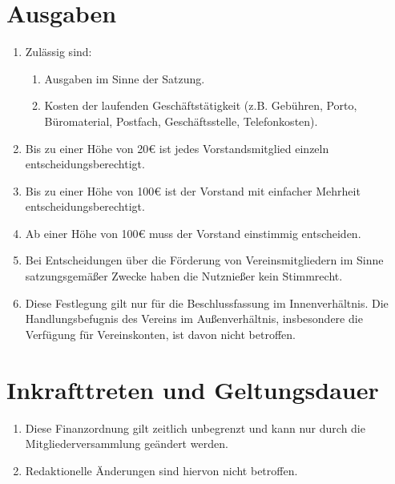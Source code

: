 \documentclass[12pt,a4paper,titlepage]{scrartcl}
\begin{document}
\section{Ausgaben}
\begin{enumerate}
\item Zulässig sind:
	\begin{enumerate}
	\item Ausgaben im Sinne der Satzung.
	\item Kosten der laufenden Geschäftstätigkeit (z.B. Gebühren, Porto, Büromaterial, 
Postfach, Geschäftsstelle, Telefonkosten).
	\end{enumerate}
	\item Bis zu einer Höhe von 20€ ist jedes Vorstandsmitglied einzeln entscheidungsberechtigt. 
	\item Bis zu einer Höhe von 100€ ist der Vorstand mit einfacher Mehrheit entscheidungsberechtigt.
	\item Ab einer Höhe von 100€ muss der Vorstand einstimmig entscheiden.
	\item Bei Entscheidungen über die Förderung von Vereinsmitgliedern im Sinne satzungsgemäßer Zwecke haben die Nutznießer kein Stimmrecht. 
	\item Diese Festlegung gilt nur für die Beschlussfassung im Innenverhältnis. Die 
Handlungsbefugnis des Vereins im Außenverhältnis, insbesondere die Verfügung für 
Vereinskonten, ist davon nicht betroffen.
\end{enumerate}
 
\section{Inkrafttreten und Geltungsdauer }
\begin{enumerate}
\item Diese Finanzordnung gilt zeitlich unbegrenzt und kann nur durch die 
Mitgliederversammlung geändert werden. 
\item Redaktionelle Änderungen sind hiervon nicht betroffen. 
\end{enumerate}
\end{document}

